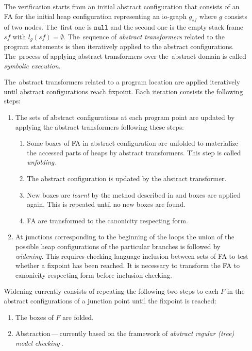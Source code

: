 The verification starts from an initial abstract configuration that consists of
an FA for the initial heap configuration representing an io-graph
$g_{\mathit{sf}}$ where $g$ consists of two nodes.
The~first one is $\texttt{null}$ and the second one is the empty stack frame
$\mathit{sf}$ with $l_g(\mathit{sf}) = \emptyset$.
The~sequence of \emph{abstract transformers} related to the program statements is then iteratively applied to the abstract configurations.
The~process of applying abstract transformers over the~abstract domain is called \emph{symbolic execution}.

The~abstract transformers related to a program location are applied iteratively until
abstract configurations reach fixpoint.
Each iteration consists the following steps:
\begin{enumerate}
		\item The sets of abstract configurations at each program point are updated by applying
			the abstract transformers following these steps:
			\begin{enumerate}
				\item Some boxes of FA in abstract configuration are unfolded to materialize
					the accessed parts of heaps by abstract transformers.
					This step is called \emph{unfolding}.
				\item The abstract configuration is updated by the abstract transformer.
				\item New boxes are \emph{learnt} by the method described in \cite{forester13}
					and boxes are applied again.
					This is repeated until no new boxes are found.
				\item FA are transformed to the canonicity respecting form.
			\end{enumerate}
		\item At junctions corresponding to the beginning of the loops
			the union of the possible heap configurations
			of the particular branches is followed by \emph{widening}.
			This requires checking language inclusion between sets
			of FA to test whether a fixpoint has been reached.
			It is necessary to transform the FA to canonicity
			respecting form before inclusion checking.
\end{enumerate}

Widening currently consists of repeating the following two steps to each $F$ in the abstract configurations of a junction point until the fixpoint is reached:
\begin{enumerate}
		\item The boxes of $F$ are folded.
		\item Abstraction\,---\,currently based on the framework of \emph{abstract regular (tree) model checking} \cite{artmc}.
\end{enumerate}

